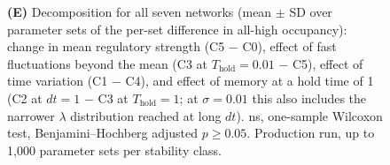 \documentclass[11pt]{article}
\providecommand{\DIFaddtex}[1]{{\protect\color{red}#1}} %
\providecommand{\DIFdeltex}[1]{} %
\providecommand{\DIFaddFL}[1]{\DIFadd{#1}} %
\providecommand{\DIFdelFL}[1]{\DIFdel{#1}} %
\providecommand{\DIFaddbeginFL}{} %
\providecommand{\DIFaddendFL}{} %
\providecommand{\DIFdelbeginFL}{} %
\providecommand{\DIFdelendFL}{} %
\providecommand{\DIFadd}[1]{\texorpdfstring{\DIFaddtex{#1}}{#1}} %
\providecommand{\DIFdel}[1]{\texorpdfstring{\DIFdeltex{#1}}{}} %
\providecommand{\DIFaddincludegraphics}[2][]{\DIFOincludegraphics[#1]{#2}} %
\providecommand{\DIFdelincludegraphics}[2][]{}
\DeclareRobustCommand{\DIFaddbeginFL}{\DIFOaddbeginFL \let\includegraphics\DIFaddincludegraphics} %
\DeclareRobustCommand{\DIFaddendFL}{\DIFOaddendFL \let\includegraphics\DIFOincludegraphics} %
\DeclareRobustCommand{\DIFdelbeginFL}{\DIFOdelbeginFL \let\includegraphics\DIFdelincludegraphics} %
\DeclareRobustCommand{\DIFdelendFL}{\DIFOaddendFL \let\includegraphics\DIFOincludegraphics} %
\begin{document}
\begin{figure}
{{    }\textbf{\DIFaddFL{(E)}} \DIFaddFL{Decomposition for all seven networks (mean $\pm$ SD over }\DIFaddendFL parameter sets \DIFaddbeginFL \DIFaddFL{of the per-set difference in all-high occupancy): change in mean regulatory strength }\DIFaddendFL (\DIFdelbeginFL \DIFdelFL{rows}\DIFdelendFL \DIFaddbeginFL \DIFaddFL{C5 $-$ C0}\DIFaddendFL )\DIFdelbeginFL \DIFdelFL{and noise level }\DIFdelendFL \DIFaddbeginFL \DIFaddFL{, effect of fast fluctuations beyond the mean }\DIFaddendFL (\DIFdelbeginFL \DIFdelFL{columns: 0.001}\DIFdelendFL \DIFaddbeginFL \DIFaddFL{C3 at $T_\text{hold} = 0.01$ $-$ C5)}\DIFaddendFL , \DIFdelbeginFL \DIFdelFL{0.01}\DIFdelendFL \DIFaddbeginFL \DIFaddFL{effect of time variation (C1 $-$ C4)}\DIFaddendFL , \DIFdelbeginFL \DIFdelFL{0.1}\DIFdelendFL \DIFaddbeginFL \DIFaddFL{and effect of memory at a hold time of 1 (C2 at $dt = 1$ $-$ C3 at $T_\text{hold} = 1$; at $\sigma = 0.01$ this also includes the narrower $\lambda$ distribution reached at long $dt$}\DIFaddendFL )\DIFaddbeginFL \DIFaddFL{. ns}\DIFaddendFL , \DIFdelbeginFL \DIFdelFL{with paired }\DIFdelendFL \DIFaddbeginFL \DIFaddFL{one-sample }\DIFaddendFL Wilcoxon \DIFdelbeginFL \DIFdelFL{significance brackets; ``*'' $p-value<0.05$}\DIFdelendFL \DIFaddbeginFL \DIFaddFL{test}\DIFaddendFL , \DIFdelbeginFL \DIFdelFL{``ns'' not significant}\DIFdelendFL \DIFaddbeginFL \DIFaddFL{Benjamini--Hochberg adjusted $p \geq 0.05$}\DIFaddendFL . \DIFaddbeginFL \DIFaddFL{Production run, up to 1}{\DIFaddFL{,}}\DIFaddFL{000 parameter sets per stability class.}\DIFaddendFL }
    \label{fig:3b}
\end{figure}
\end{document}
